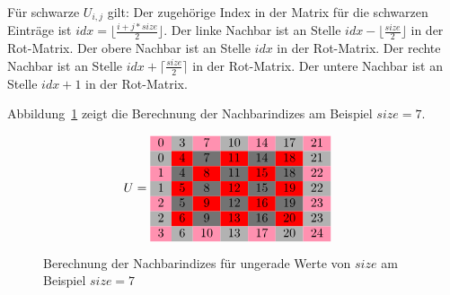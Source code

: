 \documentclass{article}
\begin{document}
Für schwarze $U_{i,j}$ gilt: Der zugehörige Index in der Matrix für die schwarzen Einträge ist $idx = \lfloor\frac{i+j*size}{2}\rfloor$. Der linke Nachbar ist an Stelle $idx - \lfloor\frac{size}{2}\rfloor$ in der Rot-Matrix. Der obere Nachbar ist an Stelle $idx$ in der Rot-Matrix. Der rechte Nachbar ist an Stelle $idx + \lceil\frac{size}{2}\rceil$ in der Rot-Matrix. Der untere Nachbar ist an Stelle $idx + 1$ in der Rot-Matrix.

Abbildung~\ref{fig:matrix:odd} zeigt die Berechnung der Nachbarindizes am Beispiel $size=7$.

\begin{figure}[h!]
\centering
$$U = 
\begin{tabular}{ccccccc}
  \cellcolor{rose}0 & \cellcolor[gray]{0.7}3 & \cellcolor{rose}7 & \cellcolor[gray]{0.7}10 & \cellcolor{rose}14 & \cellcolor[gray]{0.7}17 & \cellcolor{rose}21 \\
  
 \cellcolor[gray]{0.7}0 & \cellcolor{red}4 & \cellcolor[gray]{0.45}7 & \cellcolor{red}11 & \cellcolor[gray]{0.45}14 & \cellcolor{red}18 & \cellcolor[gray]{0.7}21\\
 
  \cellcolor{rose}1 & \cellcolor[gray]{0.45}4 & \cellcolor{red}8 & \cellcolor[gray]{0.45}11 & \cellcolor{red}15 & \cellcolor[gray]{0.45}18 & \cellcolor{rose}22\\
  
 \cellcolor[gray]{0.7}1 & \cellcolor{red}5 & \cellcolor[gray]{0.45}8 & \cellcolor{red}12 & \cellcolor[gray]{0.45}15 & \cellcolor{red}19 & \cellcolor[gray]{0.7}22\\
 
 \cellcolor{rose}2 & \cellcolor[gray]{0.45}5 & \cellcolor{red}9 & \cellcolor[gray]{0.45}12 & \cellcolor{red}16 & \cellcolor[gray]{0.45}19 & \cellcolor{rose}23\\
 
 \cellcolor[gray]{0.7}2 & \cellcolor{red}6 & \cellcolor[gray]{0.45}9 & \cellcolor{red}13 & \cellcolor[gray]{0.45}16 & \cellcolor{red}20 & \cellcolor[gray]{0.7}23\\
 
 \cellcolor{rose}3 & \cellcolor[gray]{0.7}6 & \cellcolor{rose}10 & \cellcolor[gray]{0.7}13 & \cellcolor{rose}17 & \cellcolor[gray]{0.7}20 & \cellcolor{rose}24 \\
\end{tabular} \quad
$$
\caption{Berechnung der Nachbarindizes für ungerade Werte von $size$ am Beispiel $size=7$}
\label{fig:matrix:odd}
\end{figure}
\end{document}
